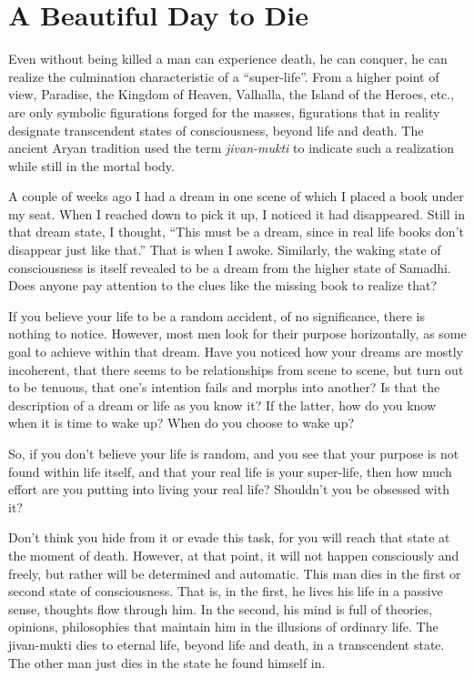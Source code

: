 \section{A Beautiful Day to Die}

\begin{quotex}
Even without being killed a man can experience death, he can conquer, he can realize the culmination characteristic of a ``super-life''. From a higher point of view, Paradise, the Kingdom of Heaven, Valhalla, the Island of the Heroes, etc., are only symbolic figurations forged for the masses, figurations that in reality designate transcendent states of consciousness, beyond life and death. The ancient Aryan tradition used the term \emph{jivan-mukti} to indicate such a realization while still in the mortal body.
\end{quotex}


A couple of weeks ago I had a dream in one scene of which I placed a book under my seat. When I reached down to pick it up, I noticed it had disappeared. Still in that dream state, I thought, ``This must be a dream, since in real life books don't disappear just like that.'' That is when I awoke. Similarly, the waking state of consciousness is itself revealed to be a dream from the higher state of Samadhi. Does anyone pay attention to the clues like the missing book to realize that?

If you believe your life to be a random accident, of no significance, there is nothing to notice. However, most men look for their purpose horizontally, as some goal to achieve within that dream. Have you noticed how your dreams are mostly incoherent, that there seems to be relationships from scene to scene, but turn out to be tenuous, that one's intention fails and morphs into another? Is that the description of a dream or life as you know it? If the latter, how do you know when it is time to wake up? When do you choose to wake up?

So, if you don't believe your life is random, and you see that your purpose is not found within life itself, and that your real life is your super-life, then how much effort are you putting into living your real life? Shouldn't you be obsessed with it?

Don't think you hide from it or evade this task, for you will reach that state at the moment of death. However, at that point, it will not happen consciously and freely, but rather will be determined and automatic. This man dies in the first or second state of consciousness. That is, in the first, he lives his life in a passive sense, thoughts flow through him. In the second, his mind is full of theories, opinions, philosophies that maintain him in the illusions of ordinary life. The jivan-mukti dies to eternal life, beyond life and death, in a transcendent state. The other man just dies in the state he found himself in.

